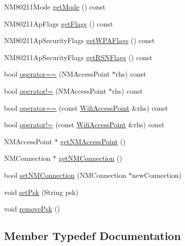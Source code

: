 \begin{DoxyCompactItemize}
\item 
N\+M80211\+Mode \mbox{\hyperlink{classWifiAccessPoint_a27bd3272631f8e9606457096825d7e02}{get\+Mode}} () const
\item 
N\+M80211\+Ap\+Flags \mbox{\hyperlink{classWifiAccessPoint_a30201886e4c9c51a0b67f83de4a03665}{get\+Flags}} () const
\item 
N\+M80211\+Ap\+Security\+Flags \mbox{\hyperlink{classWifiAccessPoint_a8b289a15f425e47ea40152b114b458b1}{get\+W\+P\+A\+Flags}} () const
\item 
N\+M80211\+Ap\+Security\+Flags \mbox{\hyperlink{classWifiAccessPoint_a78e4050d9b8c26aec6b64a778752ffc6}{get\+R\+S\+N\+Flags}} () const
\item 
bool \mbox{\hyperlink{classWifiAccessPoint_a6aea3985cd8b84de5e7cdf451dfc6fab}{operator==}} (N\+M\+Access\+Point $\ast$rhs) const
\item 
bool \mbox{\hyperlink{classWifiAccessPoint_a966c77eedcf8093d7302a5803cbb345f}{operator!=}} (N\+M\+Access\+Point $\ast$rhs) const
\item 
bool \mbox{\hyperlink{classWifiAccessPoint_acdd95fb3f88e753efe7fe682f086e3db}{operator==}} (const \mbox{\hyperlink{classWifiAccessPoint}{Wifi\+Access\+Point}} \&rhs) const
\item 
bool \mbox{\hyperlink{classWifiAccessPoint_a7f814b369462c3a06b3bd4a7d68f0e20}{operator!=}} (const \mbox{\hyperlink{classWifiAccessPoint}{Wifi\+Access\+Point}} \&rhs) const
\item 
N\+M\+Access\+Point $\ast$ \mbox{\hyperlink{classWifiAccessPoint_a366e5ca1c7e95d108cb1903b90c78c33}{get\+N\+M\+Access\+Point}} ()
\item 
N\+M\+Connection $\ast$ \mbox{\hyperlink{classWifiAccessPoint_a5d2658efdbbcbf86c3f871b4a2ec5ee6}{get\+N\+M\+Connection}} ()
\item 
bool \mbox{\hyperlink{classWifiAccessPoint_aaeead3366da810084fb1bb491aec1627}{set\+N\+M\+Connection}} (N\+M\+Connection $\ast$new\+Connection)
\item 
void \mbox{\hyperlink{classWifiAccessPoint_a6e1364c9bd6d91015e8b5b69ef09e9e3}{set\+Psk}} (String psk)
\item 
void \mbox{\hyperlink{classWifiAccessPoint_aada4d71afdd43cef918be6b84abc8784}{remove\+Psk}} ()
\end{DoxyCompactItemize}


\subsection{Member Typedef Documentation}
\mbox{\label{classWifiAccessPoint_ad18977f884076774803027efbaa131a0}} 
